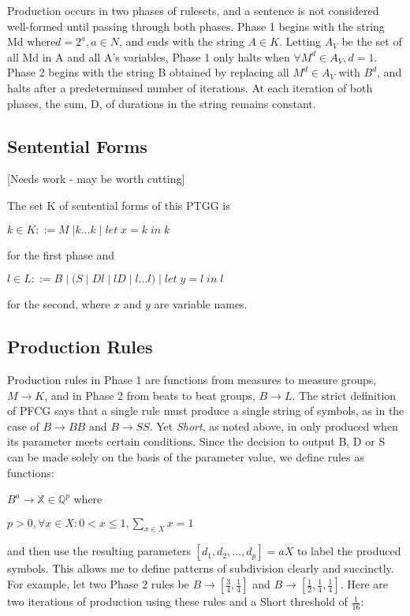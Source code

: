 \documentclass{article}
\begin{document}
Production occurs in two phases of rulesets, and a sentence is not considered well-formed until passing through both phases. Phase 1 begins with the string Md where$ d=2^a, a \in N$, and ends with the string $A \in K$. Letting $A_V$ be the set of all Md in A and all A’s variables, Phase 1 only halts when $\forall M^d \in A_V, d=1$. Phase 2 begins with the string B obtained by replacing all $M^d \in A_V$ with $B^d$, and halts after a predeterminsed number of iterations. At each iteration of both phases, the sum, D, of durations in the string remains constant.

\subsection{Sentential Forms}

[Needs work - may be worth cutting]

The set K of sentential forms of this PTGG is %

$k \in K ::= M \; | k…k \; | \;  let \; x=k \; in \; k$

\noindent for the first phase and 

$l \in L ::= B \; | \; ( S \; | \; Dl \; | \;  lD \; | \; l…l ) \; | \;  let \; y=l \; in\;  l$

\noindent for the second, where $x$ and $y$ are variable names.

\subsection{Production Rules}

Production rules in Phase 1 are functions from measures to measure groups, $M \rightarrow K$, and in Phase 2 from beats to beat groups, $B \rightarrow L$. The strict definition of PFCG says that a single rule must produce a single string of symbols, as in the case of $B \rightarrow BB$ and $B \rightarrow SS$.  Yet \emph{Short}, as noted above, in only produced when its parameter meets certain conditions. Since the decision to output B, D or S can be made solely on the basis of the parameter value, we define rules as functions:

$B^a \rightarrow \mathbb{X} \in \mathbb{Q}^{p}$ where 

$p > 0 , \forall x \in X: 0 < x \leq 1, \sum_{x \in X} x = 1$

and then use the resulting parameters $[d_1,d_2,…,d_p]=aX$ to label the produced symbols. This allows me to define patterns of subdivision clearly and succinctly. For example, let two Phase 2 rules be $B \rightarrow [\frac{3}{4}, \frac{1}{4}]$ and $B \rightarrow [\frac{1}{2}, \frac{1}{4}, \frac{1}{4}]$. Here are two iterations of production using these rules and a Short threshold of $\frac{1}{16}$:
\end{document}
